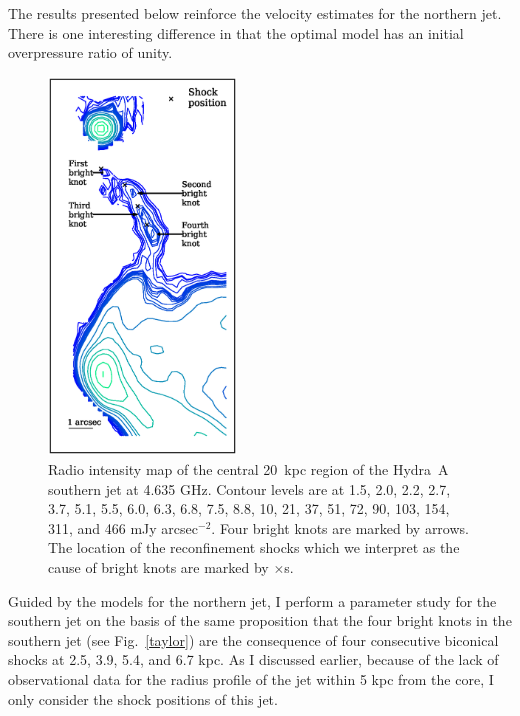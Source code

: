 The results presented below reinforce the velocity estimates for the northern jet. There is one interesting difference in that the optimal model has an initial overpressure ratio of unity. 

\begin{figure}
\centering
\includegraphics[width=5cm]{southern.eps}
\caption{ Radio intensity map of the central 20~kpc region of the Hydra~A southern jet at 4.635 GHz. Contour levels are at 1.5, 2.0, 2.2, 2.7, 3.7, 5.1, 5.5, 6.0, 6.3, 6.8, 7.5, 8.8, 10, 21, 37, 51,  72, 90, 103, 154, 311, and 466 mJy arcsec$^{-2}$. Four bright knots are marked by arrows. The location of the reconfinement shocks which we interpret as the cause of bright knots are marked by $\times$s. }
\label{southern}
\end{figure}

Guided by the models for the northern jet, I perform a parameter study for the southern jet on the basis of the same proposition that the four bright knots in the southern jet (see Fig.~\ref{taylor}) are the consequence of four consecutive biconical shocks at 2.5, 3.9, 5.4, and 6.7 kpc. As I discussed earlier, because of the lack of observational data for the radius profile of the jet within 5 kpc from the core, I only consider the shock positions of this jet.

